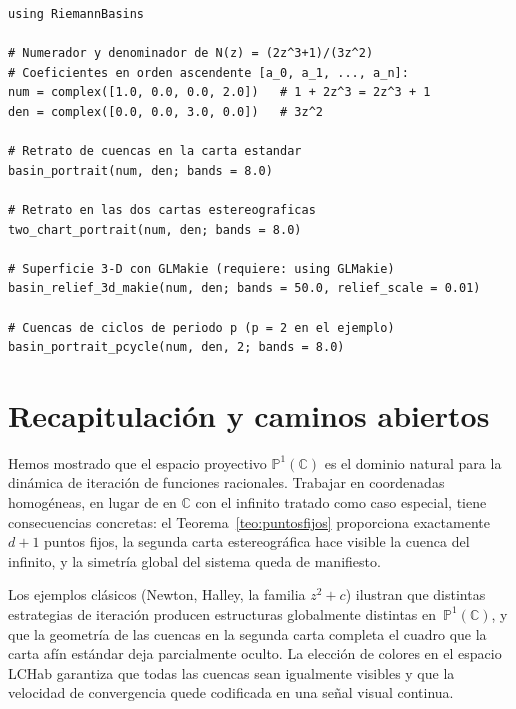 \documentclass[11pt,a4paper]{article}
\theoremstyle{plain}
\theoremstyle{definition}
\theoremstyle{remark}
\newcommand{\C}{\mathbb{C}}
\newcommand{\Puno}{\mathbb{P}^1(\mathbb{C})}
\begin{document}
\begin{lstlisting}[caption={Retrato de cuencas para Newton en $z^3-1$ con visualización en las dos cartas de $\Puno$.}]
using RiemannBasins

# Numerador y denominador de N(z) = (2z^3+1)/(3z^2)
# Coeficientes en orden ascendente [a_0, a_1, ..., a_n]:
num = complex([1.0, 0.0, 0.0, 2.0])   # 1 + 2z^3 = 2z^3 + 1
den = complex([0.0, 0.0, 3.0, 0.0])   # 3z^2

# Retrato de cuencas en la carta estandar
basin_portrait(num, den; bands = 8.0)

# Retrato en las dos cartas estereograficas
two_chart_portrait(num, den; bands = 8.0)

# Superficie 3-D con GLMakie (requiere: using GLMakie)
basin_relief_3d_makie(num, den; bands = 50.0, relief_scale = 0.01)

# Cuencas de ciclos de periodo p (p = 2 en el ejemplo)
basin_portrait_pcycle(num, den, 2; bands = 8.0)
\end{lstlisting}


\section{Recapitulación y caminos abiertos}
\label{sec:conclusion}

Hemos mostrado que el espacio proyectivo $\Puno$ es el dominio natural
para la dinámica de iteración de funciones racionales.
Trabajar en coordenadas homogéneas, en lugar de en $\C$ con el infinito
tratado como caso especial, tiene consecuencias concretas: el
Teorema~\ref{teo:puntosfijos} proporciona exactamente $d+1$ puntos fijos, la
segunda carta estereográfica hace visible la cuenca del infinito, y la
simetría global del sistema queda de manifiesto.

Los ejemplos clásicos (Newton, Halley, la familia $z^2+c$)  ilustran
que distintas estrategias de iteración producen estructuras globalmente
distintas en~$\Puno$, y que la geometría de las cuencas en la segunda
carta completa el cuadro que la carta afín estándar deja parcialmente
oculto.
La elección de colores en el espacio LCHab garantiza que todas las
cuencas sean igualmente visibles y que la velocidad de convergencia
quede codificada en una señal visual continua.
\end{document}
